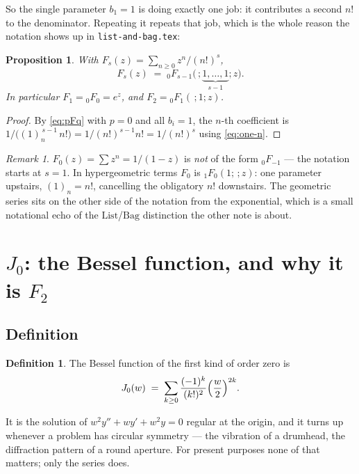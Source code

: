\documentclass[11pt,a4paper]{article}
\newtheorem{proposition}[theorem]{Proposition}
\theoremstyle{definition}
\newtheorem{definition}[theorem]{Definition}
\theoremstyle{remark}
\newtheorem{remark}[theorem]{Remark}
\begin{document}
So the single parameter $b_1 = 1$ is doing exactly one job: it contributes a second
$n!$ to the denominator. Repeating it repeats that job, which is the whole reason the
notation shows up in \texttt{list-and-bag.tex}:

\begin{proposition}\label{prop:Fs}
With $F_s(z) = \sum_{n\ge0} z^n/(n!)^s$,
\[
  F_s(z) \;=\; {}_0F_{s-1}\bigl(\,;\underbrace{1,\dots,1}_{s-1};z\bigr) .
\]
In particular $F_1 = {}_0F_0 = e^z$, and $F_2 = {}_0F_1(\,;1;z)$.
\end{proposition}

\begin{proof}
By \eqref{eq:pFq} with $p=0$ and all $b_i = 1$, the $n$-th coefficient is
$1/\bigl((1)_n^{\,s-1}\, n!\bigr) = 1/(n!)^{s-1}n! = 1/(n!)^s$ using \eqref{eq:one-n}.
\end{proof}

\begin{remark}\label{rem:whyF0}
$F_0(z) = \sum z^n = 1/(1-z)$ is \emph{not} of the form ${}_0F_{-1}$ --- the
notation starts at $s = 1$. In hypergeometric terms $F_0$ is
${}_1F_0(1;\,;z)$: one parameter upstairs, $(1)_n = n!$, cancelling the obligatory
$n!$ downstairs. The geometric series sits on the other side of the notation from the
exponential, which is a small notational echo of the $\mathrm{List}$/$\mathrm{Bag}$
distinction the other note is about.
\end{remark}

\section{$J_0$: the Bessel function, and why it is $F_2$}

\subsection{Definition}

\begin{definition}\label{def:J0}
The Bessel function of the first kind of order zero is
\[
  J_0(w) \;=\; \sum_{k \ge 0} \frac{(-1)^k}{(k!)^2}\Bigl(\frac{w}{2}\Bigr)^{2k} .
\]
\end{definition}

It is the solution of $w^2 y'' + w y' + w^2 y = 0$ regular at the origin, and it turns
up whenever a problem has circular symmetry --- the vibration of a drumhead, the
diffraction pattern of a round aperture. For present purposes none of that matters;
only the series does.
\end{document}
